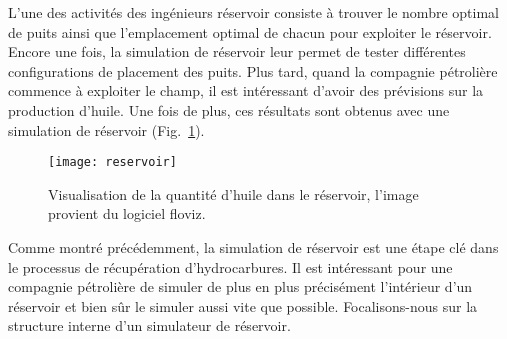 L'une des activités des ingénieurs réservoir consiste à trouver le nombre optimal de puits ainsi que l'emplacement optimal de chacun pour exploiter le réservoir.
%
Encore une fois, la simulation de réservoir leur permet de tester différentes configurations de placement des puits.
%
Plus tard, quand la compagnie pétrolière commence à exploiter le champ, il est intéressant d'avoir des prévisions sur la production d'huile.
%
Une fois de plus, ces résultats sont obtenus avec une simulation de réservoir (Fig.~\ref{fig:floviz}).

\begin{figure}[!h]
  \centering
  \texttt{[image: reservoir]}
  \caption{Visualisation de la quantité d'huile dans le réservoir, l'image provient du logiciel floviz.}
\label{fig:floviz}
\end{figure}




Comme montré précédemment, la simulation de réservoir est une étape clé dans le processus de récupération d'hydrocarbures.
%
Il est intéressant pour une compagnie pétrolière de simuler de plus en plus précisément l'intérieur d'un réservoir et bien sûr le simuler aussi vite que possible.
%
Focalisons-nous sur la structure interne d'un simulateur de réservoir.
